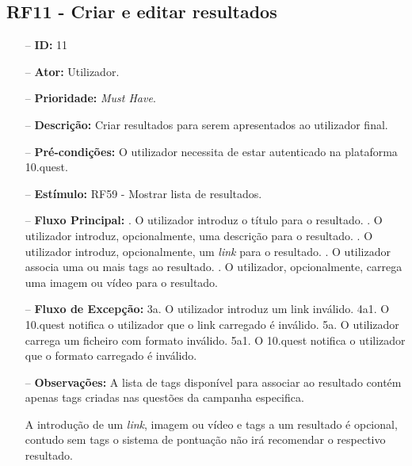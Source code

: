 \subsection{RF11 - Criar e editar resultados}
\begin{itemize}
	\item[--] \textbf{ID:} 11
	\item[--]  \textbf{Ator:} Utilizador.
	\item[--]  \textbf{Prioridade:} \textit{Must Have}.
	\item[--]  \textbf{Descrição:} Criar resultados para serem apresentados ao utilizador final.
	\item[--]  \textbf{Pré-condições:} O utilizador necessita de estar autenticado na plataforma 10.quest.
	\item[--]  \textbf{Estímulo:}  
		\subitem RF59 - Mostrar lista de resultados.
	\item[--]  \textbf{Fluxo Principal:} 
		. O utilizador introduz o título para o resultado.
		. O utilizador introduz, opcionalmente, uma descrição para o resultado.
		. O utilizador introduz, opcionalmente, um \textit{link} para o resultado.
		. O utilizador associa uma ou mais tags ao resultado.
		. O utilizador, opcionalmente, carrega uma imagem ou vídeo para o resultado.
	\item[--]  \textbf{Fluxo de Excepção:} 
		\subitem 3a. O utilizador introduz um link inválido.
		\subitem 4a1. O 10.quest notifica o utilizador que o link carregado é inválido.
		\subitem 5a. O utilizador carrega um ficheiro com formato inválido.
		\subitem 5a1. O 10.quest notifica o utilizador que o formato carregado é inválido.
	\item[--]  \textbf{Observações:} 
	A lista de tags disponível para associar ao resultado contém apenas tags criadas nas questões da campanha especifica.
	
	A introdução de um \textit{link}, imagem ou vídeo e tags a um resultado é opcional, contudo sem tags o sistema de pontuação não irá recomendar o respectivo resultado.	
	
\end{itemize}
\newpage

